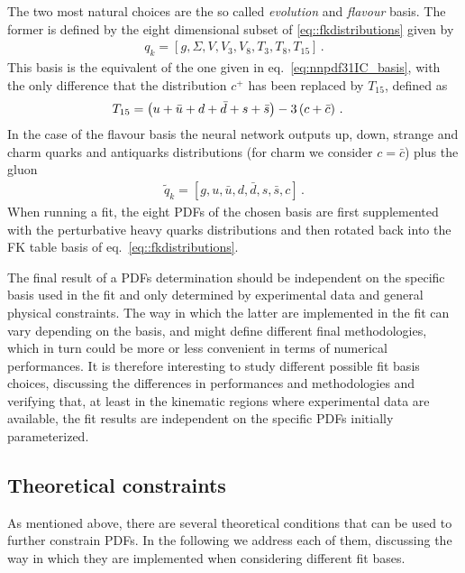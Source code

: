 %
The two most natural choices are the so called \textit{evolution} and \textit{flavour} basis.
The former is defined by the eight dimensional subset of \eqref{eq::fkdistributions} given by 
\begin{align}
    \label{eq:evolution_basis}
    q_k = \left[g, \Sigma, V, V_3, V_8, T_3, T_8, T_{15} \right]\,.
\end{align}
This basis is the equivalent of the one given in eq.~\eqref{eq:nnpdf31IC_basis}, with the only difference
that the distribution $c^+$ has been replaced by $T_{15}$, defined as 
\begin{align}
    T_{15}     &=  \left( u+\bar{u} +  d+\bar{d} +  s+\bar{s} \right) - 3\left(   c+\bar{c}\right) \, .
\end{align}
In the case of the flavour basis the neural network outputs   
up, down, strange and charm quarks and antiquarks distributions (for charm we consider $c=\bar{c}$) plus the gluon
\begin{align}
    \label{eq:flavour_basis}
	\tilde{q}_k = \left[g, u, \bar{u}, d, \bar{d}, s, \bar{s}, c\right]\,.
\end{align} 
When running a fit, the eight PDFs of the chosen basis are first supplemented with the perturbative heavy quarks
distributions and then rotated back into the FK table basis of eq.~\eqref{eq::fkdistributions}.

%
The final result of a PDFs determination should be independent on the specific basis used in the fit
and only determined by experimental data and general physical constraints.
The way in which the latter are implemented in the fit can vary depending on the basis,
and might define different final methodologies, which in turn could be more or less convenient
in terms of numerical performances. It is therefore interesting to study different possible
fit basis choices, discussing the differences in performances and methodologies and verifying that,
at least in the kinematic regions where experimental data are available, the 
fit results are independent on the specific PDFs initially parameterized.


\subsection{Theoretical constraints}
\label{sec:theory_constraints}

As mentioned above, there are several theoretical conditions that can be used to further constrain PDFs.
In the following we address each of them, discussing the way in which they are implemented when considering
different fit bases.

